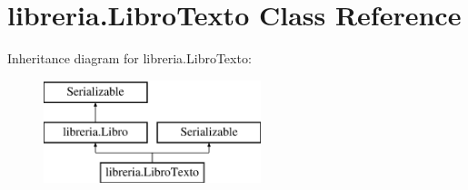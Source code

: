 \hypertarget{classlibreria_1_1_libro_texto}{}\section{libreria.\+Libro\+Texto Class Reference}
\label{classlibreria_1_1_libro_texto}
Inheritance diagram for libreria.\+Libro\+Texto\+:\begin{figure}[H]
\begin{center}
\leavevmode
\includegraphics[height=3.000000cm]{classlibreria_1_1_libro_texto}
\end{center}
\end{figure}
